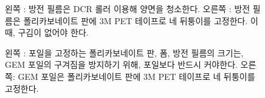 \documentclass[11pt]{article}
\begin{document}
\begin{figure}[htb]
  \centering
  \caption[방전 필름의 처리]{왼쪽 : 방전 필름은 DCR 롤러 이용해 양면을 청소한다. 오른쪽 : 방전 필름은 폴리카보네이트 판에 3M PET 테이프로 네 뒤퉁이를 고정한다. 이 때, 구김이 없어야 한다.}
  \label{fig:anti_static}
\end{figure}

\begin{figure}[htb]
  \centering
  \caption[GEM 포일의 고정]{왼쪽 : 포일을 고정하는 폴리카보네이트 판, 폼, 방전 필름의 크기는, GEM 포일의 구겨짐을 방지하기 위해, 포일보다 반드시 커야한다. 오른쪽: GEM 포일은 폴리카보네이트 판에 3M PET 테이프로 네 뒤퉁이를 고정한다.}
  \label{fig:fixing_foil}
\end{figure}
\end{document}
